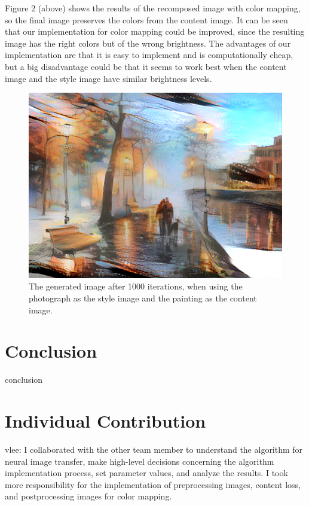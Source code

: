 \documentclass[10pt,twocolumn,letterpaper]{article}
\begin{document}
Figure 2 (above) shows the results of the recomposed image with color mapping, so the final image preserves the colors from the content image. It can be seen that our implementation for color mapping could be improved, since the resulting image has the right colors but of the wrong brightness. The advantages of our implementation are that it is easy to implement and is computationally cheap, but a big disadvantage could be that it seems to work best when the content image and the style image have similar brightness levels.

\begin{figure}[t]
\begin{center}
\includegraphics[width=0.8\linewidth]{brooklyn_night/out.png}
\end{center}
   \caption{The generated image after 1000 iterations, when using the photograph as the style image and the painting as the content image.}
\label{fig:long}
\label{fig:onecol}
\end{figure}

\section{Conclusion}

conclusion

\section{Individual Contribution}

vlee: I collaborated with the other team member to understand the algorithm for neural image transfer, make high-level decisions concerning the algorithm implementation process, set parameter values, and analyze the results. I took more responsibility for the implementation of preprocessing images, content loss, and postprocessing images for color mapping.
\end{document}
